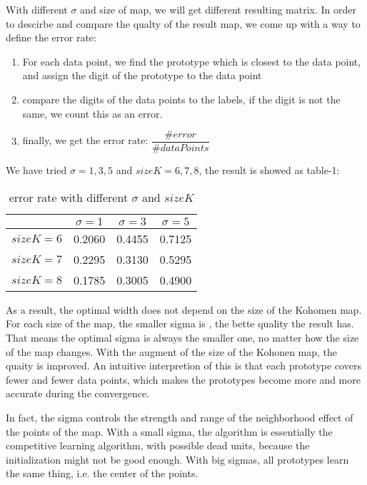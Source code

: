 \documentclass[a4paper, 12pt]{article}
\begin{document}
With different $\sigma$ and size of map, we will get different
resulting matrix. In order to descirbe and compare the qualty of the
result map, we come up with a way to define the error rate:

\begin{enumerate}
\item For each data point, we find the prototype which is closest to
  the data point, and assign the digit of the prototype to the data
  point
\item compare the digits of the data points to the labels, if the
  digit is not the same, we count this as an error.
\item finally, we get the error rate: $\dfrac{\#error}{\#dataPoints}$
\end{enumerate}

We have tried $\sigma = 1, 3, 5$ and $sizeK = 6, 7, 8$, the result is showed as table-1:

\begin{table}[!hbp]
\centering
\begin{tabular}{|c|c|c|c|}
\hline
 & $\sigma = 1$ & $\sigma = 3$ & $\sigma = 5$\\
\hline
$sizeK = 6$ &  0.2060 & 0.4455 & 0.7125\\
\hline
$sizeK = 7$ & 0.2295 & 0.3130 & 0.5295\\
\hline
$sizeK = 8$ & 0.1785 & 0.3005 & 0.4900\\
\hline
\end{tabular}
\caption{error rate with different $\sigma$ and $sizeK$}
\end{table}

As a result, the optimal width does not depend on the size of the Kohomen map. For each size of the map, the smaller sigma is , the bette quality the result has. That means the optimal sigma is always the smaller one, no matter how the size of the map changes. With the augment of the size of the Kohonen map, the quaity is improved. An intuitive interpretion of this is that each prototype covers fewer and fewer data points, which makes the prototypes become more and more accurate during the convergence.

In fact, the sigma controls the strength and range of the neighborhood effect of the points of the map. With a small sigma, the algorithm is essentially the competitive learning algorithm, with possible dead units, because the initialization might not be good enough. With big sigmas, all prototypes learn the same thing, i.e. the center of the points.
\end{document}

